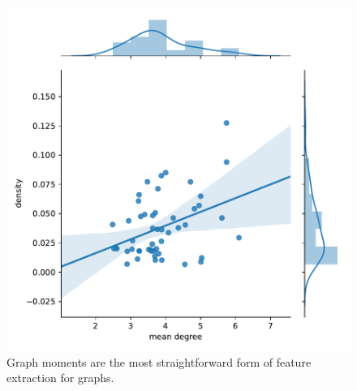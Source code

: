 \begin{figure}
    \centering
    \includegraphics[width=0.4\width]{figures/density_vs_degree}
    \caption{Graph moments are the most straightforward form of feature extraction for graphs.}
    \label{fig:density_vs_degree}
\end{figure}
